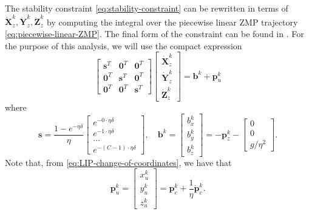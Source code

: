The stability constraint \eqref{eq:stability-constraint} can be rewritten in 
terms of $\dot{\bm{X}}_z^k, \dot{\bm{Y}}_z^k, \dot{\bm{Z}}_z^k$ by computing
the integral over the piecewise linear ZMP trajectory \eqref{eq:piecewise-linear-ZMP}.
The final form of the constraint can be found in \cite{Scianca2020TRO}.
For the purpose of this analysis, we will use the compact expression
\begin{equation}
    \label{eq:stability-constraint-matrix}
    \begin{bmatrix}
        \bm{s}^T & \bm{0}^T & \bm{0}^T \\
        \bm{0}^T & \bm{s}^T & \bm{0}^T \\
        \bm{0}^T & \bm{0}^T & \bm{s}^T
    \end{bmatrix}
    \begin{bmatrix}
        \dot{\bm{X}}_z^k \\ \dot{\bm{Y}}_z^k \\ \dot{\bm{Z}}_z^k
    \end{bmatrix}
    =
    \bm{b}^k + \bm{p}_u^k
\end{equation}
where
\begin{equation}
    \bm{s} =
    \frac{1-e^{-\eta\delta}}{\eta}
    \begin{bmatrix}
        e^{-0\cdot\eta\delta} \\
        e^{-1\cdot\eta\delta} \\
        \dots \\
        e^{-(C-1)\cdot\eta\delta}
    \end{bmatrix}, \quad
    \bm{b}^k
    =
    \begin{bmatrix}
        b_x^k \\ b_y^k \\ b_z^k
    \end{bmatrix}
    =
    -\bm{p}_z^k -
    \begin{bmatrix}
        0 \\ 0 \\ g / \eta^2
    \end{bmatrix}.
\end{equation}
Note that, from \ref{eq:LIP-change-of-coordinates}, we have that
\begin{equation}
    \bm{p}_u^k
    =
    \begin{bmatrix}
        x_u^k \\ y_u^k \\ z_u^k
    \end{bmatrix}
    =
    \bm{p}_c^k + \frac{1}{\eta} \dot{\bm{p}}_c^k.
\end{equation}

